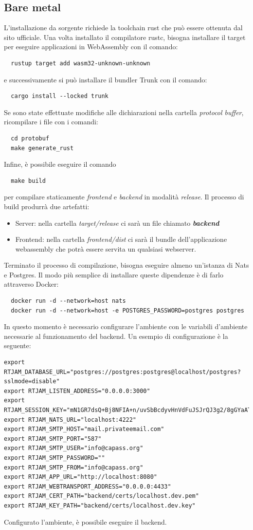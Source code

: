 \documentclass{article}
\begin{document}
\subsection{Bare metal}
L'installazione da sorgente richiede la toolchain rust che può essere ottenuta dal sito
ufficiale. 
Una volta installato il compilatore rustc, bisogna installare il target per 
eseguire applicazioni in WebAssembly con il comando:
\begin{verbatim}
  rustup target add wasm32-unknown-unknown
\end{verbatim}
e successivamente si può installare il bundler Trunk con il comando:
\begin{verbatim}
  cargo install --locked trunk
\end{verbatim}
Se sono state effettuate modifiche alle dichiarazioni nella cartella \textit{protocol
buffer}, ricompilare i file con i comandi:
\begin{verbatim}
  cd protobuf
  make generate_rust
\end{verbatim}

Infine, è possibile eseguire il comando 
\begin{verbatim}
  make build 
\end{verbatim}
per compilare staticamente \textit{frontend} e \textit{backend} in modalità \textit{release}. 
Il processo di build produrrà due artefatti:
\begin{itemize}
  \item Server: nella cartella \textit{target/release} ci sarà un file chiamato \textbf{\textit{backend}}
  \item Frontend: nella cartella \textit{frontend/dist} ci sarà il bundle dell'applicazione
    webassembly che potrà essere servita un qualsiasi webserver.
\end{itemize}

Terminato il processo di compilazione, bisogna eseguire almeno un'istanza di Nats e Postgres. 
Il modo più semplice di installare queste dipendenze è di farlo attraverso Docker:

\begin{verbatim}
  docker run -d --network=host nats
  docker run -d --network=host -e POSTGRES_PASSWORD=postgres postgres 
\end{verbatim}
In questo momento è necessario configurare l'ambiente con le variabili d'ambiente necessarie 
al funzionamento del backend. Un esempio di configurazione è la seguente:
\begin{verbatim}
export RTJAM_DATABASE_URL="postgres://postgres:postgres@localhost/postgres?sslmode=disable"
export RTJAM_LISTEN_ADDRESS="0.0.0.0:3000"
export RTJAM_SESSION_KEY="mN1GR7dsQ+Bj8NFIA+n/uvSbBcdyvHnVdFuJSJrQJ3g2/8gGYaATt3Wv7j3xKpD07652no/eddRdD7sJTVjg4w=="
export RTJAM_NATS_URL="localhost:4222"
export RTJAM_SMTP_HOST="mail.privateemail.com"
export RTJAM_SMTP_PORT="587"
export RTJAM_SMTP_USER="info@capass.org"
export RTJAM_SMTP_PASSWORD=""
export RTJAM_SMTP_FROM="info@capass.org"
export RTJAM_APP_URL="http://localhost:8080"
export RTJAM_WEBTRANSPORT_ADDRESS="0.0.0.0:4433"
export RTJAM_CERT_PATH="backend/certs/localhost.dev.pem"
export RTJAM_KEY_PATH="backend/certs/localhost.dev.key"
\end{verbatim}
Configurato l'ambiente, è possibile eseguire il backend.
\end{document}
